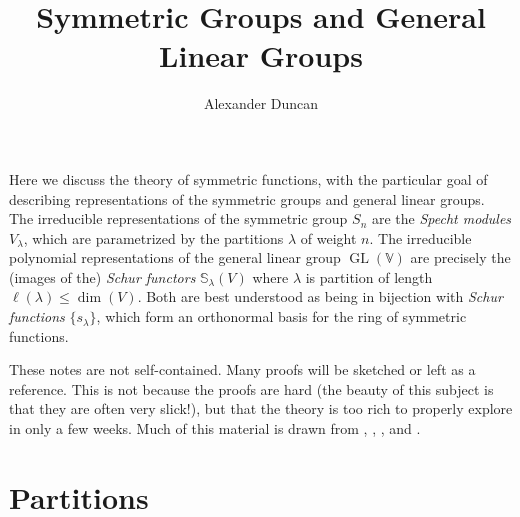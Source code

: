 \documentclass[12pt]{article}
\theoremstyle{plain}
\theoremstyle{definition}
\theoremstyle{remark}
\numberwithin{equation}{section}
\begin{document}
\title{Symmetric Groups and General Linear Groups}
\author{Alexander Duncan}

\maketitle

Here we discuss the theory of symmetric functions, with the particular
goal of describing representations of the symmetric groups and general
linear groups.
The irreducible representations of the symmetric group
$S_n$ are the \emph{Specht modules} $V_\lambda$, which are parametrized
by the partitions $\lambda$ of weight $n$.
The irreducible polynomial representations of the general linear group
$\operatorname{GL}(\mathbb{V})$ are precisely the (images of the)
\emph{Schur functors} $\mathbb{S}_\lambda(V)$ where $\lambda$ is
partition of length $\ell(\lambda) \le \dim(V)$.
Both are best understood as being in bijection with \emph{Schur
functions} $\{ s_\lambda \}$, which form an orthonormal basis for the
ring of symmetric functions. 

These notes are not self-contained.  Many proofs will be sketched or
left as a reference.  This is not because the proofs are hard (the
beauty of this subject is that they are often very slick!), but that the
theory is too rich to properly explore in only a few weeks.
Much of this material is drawn from
\cite[\S{4,6,A}]{FultonHarris},
\cite[\S{5.12--5.19}]{Etingof},
\cite[\S{I}]{Macdonald}, and
\cite[\S{7}]{Stanley2}.


\section{Partitions}
\end{document}

